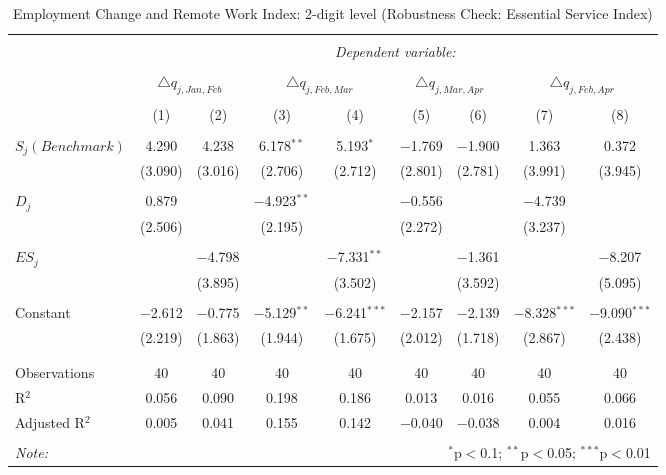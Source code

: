 
\begin{table}[!htbp] \centering 
  \caption{Employment Change and Remote Work Index: 2-digit level (Robustness Check: Essential Service Index)} 
  \label{tab:regression_dynamics_2digit_robustness_essential_service} 
\footnotesize 
\begin{tabular}{@{\extracolsep{5pt}}lcccccccc} 
\\[-1.8ex]\hline 
\hline \\[-1.8ex] 
 & \multicolumn{8}{c}{\textit{Dependent variable:}} \\ 
\cline{2-9} 
\\[-1.8ex] & \multicolumn{2}{c}{$\triangle q_{j,Jan,Feb}$} & \multicolumn{2}{c}{$\triangle q_{j,Feb,Mar}$} & \multicolumn{2}{c}{$\triangle q_{j,Mar,Apr}$} & \multicolumn{2}{c}{$\triangle q_{j,Feb,Apr}$} \\ 
\\[-1.8ex] & (1) & (2) & (3) & (4) & (5) & (6) & (7) & (8)\\ 
\hline \\[-1.8ex] 
 $S_{j} (Benchmark)$ & 4.290 & 4.238 & 6.178$^{**}$ & 5.193$^{*}$ & $-$1.769 & $-$1.900 & 1.363 & 0.372 \\ 
  & (3.090) & (3.016) & (2.706) & (2.712) & (2.801) & (2.781) & (3.991) & (3.945) \\ 
  & & & & & & & & \\ 
 $D_{j}$ & 0.879 &  & $-$4.923$^{**}$ &  & $-$0.556 &  & $-$4.739 &  \\ 
  & (2.506) &  & (2.195) &  & (2.272) &  & (3.237) &  \\ 
  & & & & & & & & \\ 
 $ES_{j}$ &  & $-$4.798 &  & $-$7.331$^{**}$ &  & $-$1.361 &  & $-$8.207 \\ 
  &  & (3.895) &  & (3.502) &  & (3.592) &  & (5.095) \\ 
  & & & & & & & & \\ 
 Constant & $-$2.612 & $-$0.775 & $-$5.129$^{**}$ & $-$6.241$^{***}$ & $-$2.157 & $-$2.139 & $-$8.328$^{***}$ & $-$9.090$^{***}$ \\ 
  & (2.219) & (1.863) & (1.944) & (1.675) & (2.012) & (1.718) & (2.867) & (2.438) \\ 
  & & & & & & & & \\ 
\hline \\[-1.8ex] 
Observations & 40 & 40 & 40 & 40 & 40 & 40 & 40 & 40 \\ 
R$^{2}$ & 0.056 & 0.090 & 0.198 & 0.186 & 0.013 & 0.016 & 0.055 & 0.066 \\ 
Adjusted R$^{2}$ & 0.005 & 0.041 & 0.155 & 0.142 & $-$0.040 & $-$0.038 & 0.004 & 0.016 \\ 
\hline 
\hline \\[-1.8ex] 
\textit{Note:}  & \multicolumn{8}{r}{$^{*}$p$<$0.1; $^{**}$p$<$0.05; $^{***}$p$<$0.01} \\ 
\end{tabular} 
\end{table} 
